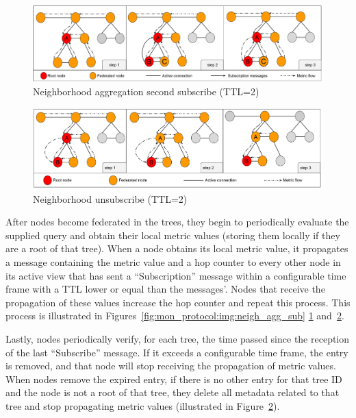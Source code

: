 \begin{figure}[htbp]
    \centering
    \includegraphics[width=\textwidth]{Chapters/aggregation/images/2nd_subscribe.pdf}
    \caption{Neighborhood aggregation second subscribe (TTL=2)}
    \label{fig:mon_protocol:img:neigh_agg_second_sub}
\end{figure}


\begin{figure}[htbp]
    \centering
    \includegraphics[width=\textwidth]{Chapters/aggregation/images/unsubscribe_process.pdf}
    \caption{Neighborhood unsubscribe (TTL=2)}
    \label{fig:mon_protocol:img:neigh_agg_unsub}
\end{figure}

After nodes become federated in the trees, they begin to periodically evaluate the supplied query and obtain their local metric values (storing them locally if they are a root of that tree). When a node obtains its local metric value, it propagates a message containing the metric value and a hop counter to every other node in its active view that has sent a ``Subscription'' message within a configurable time frame with a TTL lower or equal than the messages'. Nodes that receive the propagation of these values increase the hop counter and repeat this process. This process is illustrated in Figures~\ref{fig:mon_protocol:img:neigh_agg_sub} \ref{fig:mon_protocol:img:neigh_agg_second_sub} and~\ref{fig:mon_protocol:img:neigh_agg_unsub}. 
    
Lastly, nodes periodically verify, for each tree, the time passed since the reception of the last ``Subscribe'' message. If it exceeds a configurable time frame, the entry is removed, and that node will stop receiving the propagation of metric values. When nodes remove the expired entry, if there is no other entry for that tree ID and the node is not a root of that tree, they delete all metadata related to that tree and stop propagating metric values (illustrated in Figure~\ref{fig:mon_protocol:img:neigh_agg_unsub}).

